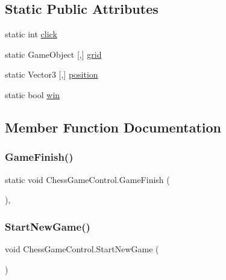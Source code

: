 \subsection*{Static Public Attributes}
\begin{DoxyCompactItemize}
\item 
static int \mbox{\hyperlink{class_chess_game_control_aac96797687bb522aa3aea376268775e8}{click}}
\item 
static Game\+Object \mbox{[},\mbox{]} \mbox{\hyperlink{class_chess_game_control_a7279acdb582d5633c8122b405293a059}{grid}}
\item 
static Vector3 \mbox{[},\mbox{]} \mbox{\hyperlink{class_chess_game_control_ada0f979d5d329c8280497c11c87e882a}{position}}
\item 
static bool \mbox{\hyperlink{class_chess_game_control_a50c474be4f430b946ca89f3e898a25a1}{win}}
\end{DoxyCompactItemize}


\subsection{Member Function Documentation}
\mbox{\label{class_chess_game_control_a3729a1181e9013740d165af9de103390}} 
\subsubsection{\texorpdfstring{Game\+Finish()}{GameFinish()}}
{\footnotesize\ttfamily static void Chess\+Game\+Control.\+Game\+Finish (\begin{DoxyParamCaption}{ }\end{DoxyParamCaption})\hspace{0.3cm}{\ttfamily [inline]}, {\ttfamily [static]}}

\mbox{\label{class_chess_game_control_affafb753ad71eda5251f7945674298d9}} 
\subsubsection{\texorpdfstring{Start\+New\+Game()}{StartNewGame()}}
{\footnotesize\ttfamily void Chess\+Game\+Control.\+Start\+New\+Game (\begin{DoxyParamCaption}{ }\end{DoxyParamCaption})\hspace{0.3cm}{\ttfamily [inline]}}



